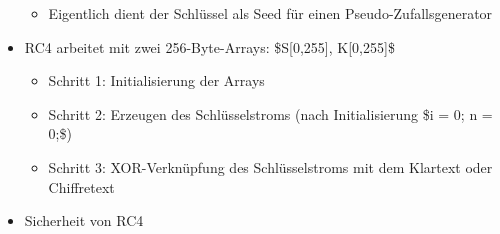 \documentclass[a4paper]{article}
\begin{document}
\begin{multicols}{3}
\begin{itemize}
              \begin{itemize}
                  \item
                        Eigentlich dient der Schlüssel als Seed für einen
                        Pseudo-Zufallsgenerator
              \end{itemize}
        \item
              RC4 arbeitet mit zwei 256-Byte-Arrays: \$S{[}0,255{]}, K{[}0,255{]}\$

              \begin{itemize}
                  \item
                        Schritt 1: Initialisierung der Arrays

                  \item
                        Schritt 2: Erzeugen des Schlüsselstroms (nach Initialisierung \$i =
                        0; n = 0;\$)

                  \item
                        Schritt 3: XOR-Verknüpfung des Schlüsselstroms mit dem Klartext oder
                        Chiffretext
              \end{itemize}
        \item
              Sicherheit von RC4


\end{itemize}
\end{multicols}
\end{document}
